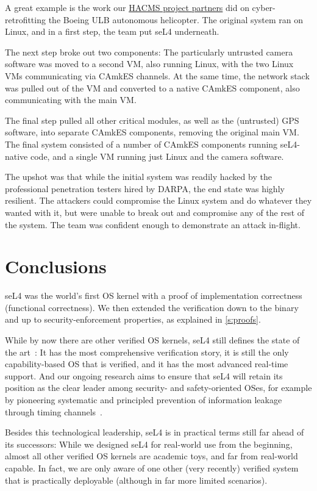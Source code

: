 \documentclass[english,a4paper,12pt\ifDraft,draft\fi]{report}
\newcommand{\Sect}[1]{\section{#1}}
\newcommand{\Sect}[1]{\chapter{#1}}
\providecommand{\href}[2]{\url{#2}}
\begin{document}
  A great example is the work our \href{https://trustworthy.systems/projects/TS/SMACCM/}{HACMS project partners} did on cyber-retrofitting the Boeing
  ULB autonomous helicopter. The original system ran on Linux, and in
  a first step, the team put seL4 underneath.

  The next step broke out two components: The particularly untrusted
  camera software was moved to a second VM, also running Linux, with
  the two Linux VMs communicating via CAmkES channels. At the same
  time, the network stack was pulled out of the VM and converted to a
  native CAmkES component, also communicating with the main VM.

  The final step pulled all other critical modules, as well as the
  (untrusted) GPS software, into separate CAmkES components, removing
  the original main VM. The final system consisted of a number of
  CAmkES components running seL4-native code, and a single VM running
  just Linux and the camera software.

  The upshot was that while the initial system was readily hacked by
  the professional penetration testers hired by DARPA, the end state was highly
  resilient. The attackers could compromise the Linux system and do
  whatever they wanted with it, but were unable to break out and
  compromise any of the rest of the system. The team was confident
  enough to demonstrate an attack in-flight.

  \Sect{\label{s:concl}Conclusions}

  seL4 was the world's first OS kernel with a proof of implementation
  correctness (functional correctness). We then extended the
  verification down to the
  binary and up to security-enforcement properties, as explained in
  \autoref{s:proofs}.

  While by now there are other verified OS kernels, seL4 still defines
  the state of the art~\citep{Heiser:10y-blog}: It has the most
  comprehensive verification story, it is still the only
  capability-based OS that is verified, and it has the most advanced
  real-time support. And our ongoing research aims to ensure that
  seL4 will retain its position as the clear leader among security-
  and safety-oriented OSes, for example by pioneering systematic and
  principled prevention of information leakage through timing
  channels~\citep{Ge_YCH_19}.

  Besides this technological leadership, seL4 is in practical terms
  still far ahead of its successors: While we designed seL4 for
  real-world use from the beginning, almost all other verified OS
  kernels are academic toys, and far from real-world capable. In fact, we
  are only aware of one other (very recently) verified system that is
  practically deployable (although in far more limited scenarios).
\end{document}
